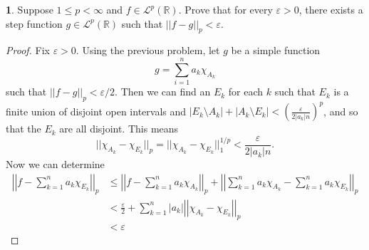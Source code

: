 \documentclass[12pt]{article}
\theoremstyle{definition}
\newtheorem{ex}{}
\newenvironment{exercise}[1]{
	\renewcommand{\theex}{#1}
	\begin{ex}
		}{\end{ex}}
\begin{document}
\begin{exercise}{7A.18}
	Suppose $1 \leq p < \infty$ and $f \in \mathcal{L}^p(\mathbb{R})$.
	Prove that for every $\varepsilon > 0$, there exists a step function $g \in \mathcal{L}^p(\mathbb{R})$ such that $||f-g||_p < \varepsilon$.
\end{exercise}
\begin{proof}
	Fix $\varepsilon > 0$.
	Using the previous problem, let $g$ be a simple function \begin{equation*}
		g = \sum_{i=1}^n a_k\chi_{A_k}
	\end{equation*}
	such that $||f-g||_p < \varepsilon/2$.
	Then we can find an $E_k$ for each $k$ such that $E_k$ is a finite union of disjoint open intervals and $|E_k \setminus A_k| + |A_k \setminus E_k| < (\frac{\varepsilon}{2|a_k|n})^{p}$, and so that the $E_k$ are all disjoint.
	This means \begin{equation*}
		||\chi_{A_k} - \chi_{E_k}||_p = ||\chi_{A_k} - \chi_{E_k}||_1^{1/p} < \frac{\varepsilon}{2|a_k|n}.
	\end{equation*}
	Now we can determine \begin{align*}
		\left| \left| f - \sum_{k=1}^n a_k \chi_{E_k} \right| \right|_p & \leq \left| \left| f - \sum_{k = 1}^n a_k \chi_{A_k} \right| \right|_p + \left| \left| \sum_{k=1}^n a_k\chi_{A_k} - \sum_{k=1}^n a_k\chi_{E_k} \right| \right|_p \\
		                                                                & < \frac{\varepsilon}{2} + \sum_{k=1}^n |a_k| \left| \left| \chi_{A_k} - \chi_{E_k} \right| \right|_p                                                             \\
		                                                                & < \varepsilon
	\end{align*}
\end{proof}
\end{document}
